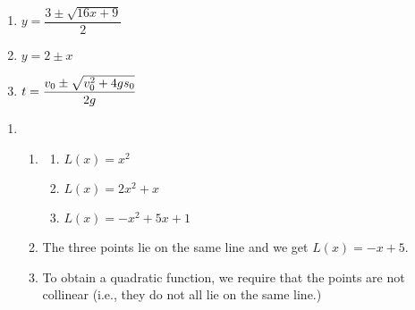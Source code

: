 \documentclass{ximera}
\begin{document}
\begin{multicols}{3}
\begin{enumerate}
\setcounter{enumi}{\value{HW}}


\item $y = \dfrac{3 \pm \sqrt{16x + 9}}{2}$ 
\item $y = 2 \pm x$ 
\item $t = \dfrac{v_{\mbox{\scriptsize $0$}} \pm \sqrt{v_{\mbox{\scriptsize $0$}}^{2} + 4gs_{\mbox{\scriptsize $0$}}}}{2g}  $

\setcounter{HW}{\value{enumi}}
\end{enumerate}
\end{multicols}

\begin{enumerate}
\setcounter{enumi}{\value{HW}}

\item
\begin{enumerate}

\item \begin{multicols}{3}

\begin{enumerate}

\item   $L(x) = x^2$

\item   $L(x) = 2x^2+x$

\item  $L(x) = -x^2+5x+1$

\end{enumerate}

\end{multicols}

\addtocounter{enumii}{1}

\vspace{-.1in}

\item The three points lie on the same line and we get $L(x) = -x+5$.

\item  To obtain a quadratic function, we require that the points are not collinear (i.e., they do not all lie on the same line.)


\end{enumerate}

\setcounter{HW}{\value{enumi}}
\end{enumerate}
\end{document}
